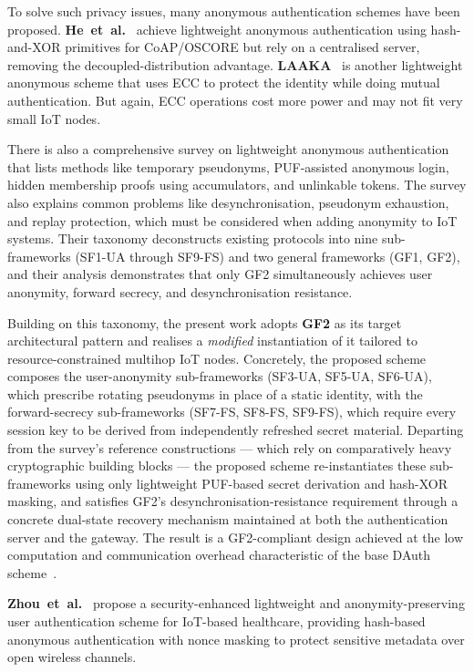 \documentclass[12pt,a4paper]{report}
\begin{document}
To solve such privacy issues, many anonymous authentication schemes have been
proposed.
\textbf{He~et~al.}~\cite{he2023lightweight} achieve lightweight anonymous
authentication using hash-and-XOR primitives for CoAP/OSCORE but rely on a
centralised server, removing the decoupled-distribution advantage.
\textbf{LAAKA}~\cite{ali2024laaka} is another lightweight anonymous scheme that uses
ECC to protect the identity while doing mutual authentication.
But again, ECC operations cost more power and may not fit very small IoT nodes.

There is also a comprehensive survey on lightweight anonymous
authentication~\cite{zhong2025survey} that lists methods like temporary pseudonyms,
PUF-assisted anonymous login, hidden membership proofs using accumulators, and
unlinkable tokens.
The survey also explains common problems like desynchronisation, pseudonym
exhaustion, and replay protection, which must be considered when adding anonymity to
IoT systems.
Their taxonomy deconstructs existing protocols into nine sub-frameworks (SF1-UA
through SF9-FS) and two general frameworks (GF1, GF2), and their analysis
demonstrates that only GF2 simultaneously achieves user anonymity, forward secrecy,
and desynchronisation resistance.

Building on this taxonomy, the present work adopts \textbf{GF2} as its target
architectural pattern and realises a \emph{modified} instantiation of it tailored to
resource-constrained multihop IoT nodes.
Concretely, the proposed scheme composes the user-anonymity sub-frameworks
(SF3-UA, SF5-UA, SF6-UA), which prescribe rotating pseudonyms in place of a static
identity, with the forward-secrecy sub-frameworks (SF7-FS, SF8-FS, SF9-FS), which
require every session key to be derived from independently refreshed secret material.
Departing from the survey's reference constructions — which rely on comparatively
heavy cryptographic building blocks — the proposed scheme re-instantiates these
sub-frameworks using only lightweight PUF-based secret derivation and hash-XOR
masking, and satisfies GF2's desynchronisation-resistance requirement through a
concrete dual-state recovery mechanism maintained at both the authentication server
and the gateway.
The result is a GF2-compliant design achieved at the low computation and
communication overhead characteristic of the base DAuth scheme~\cite{das2026comsnets}.

\textbf{Zhou~et~al.}~\cite{zhou2024auth} propose a security-enhanced lightweight
and anonymity-preserving user authentication scheme for IoT-based healthcare,
providing hash-based anonymous authentication with nonce masking to protect sensitive
metadata over open wireless channels.
\end{document}
